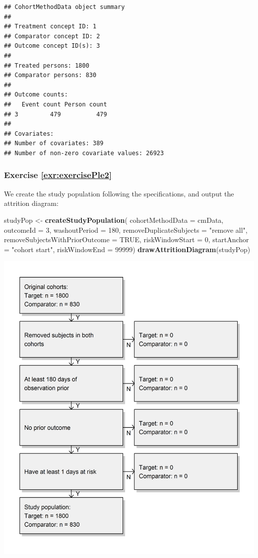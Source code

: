 \documentclass[11pt]{book}
\newenvironment{Shaded}{\begin{snugshade}}{\end{snugshade}}
\newcommand{\KeywordTok}[1]{\textcolor[rgb]{0.13,0.29,0.53}{\textbf{#1}}}
\newcommand{\DataTypeTok}[1]{\textcolor[rgb]{0.13,0.29,0.53}{#1}}
\newcommand{\DecValTok}[1]{\textcolor[rgb]{0.00,0.00,0.81}{#1}}
\newcommand{\StringTok}[1]{\textcolor[rgb]{0.31,0.60,0.02}{#1}}
\newcommand{\OtherTok}[1]{\textcolor[rgb]{0.56,0.35,0.01}{#1}}
\newcommand{\NormalTok}[1]{#1}
\theoremstyle{definition}
\theoremstyle{definition}
\theoremstyle{definition}
\theoremstyle{remark}
\begin{document}
\begin{verbatim}
## CohortMethodData object summary
## 
## Treatment concept ID: 1
## Comparator concept ID: 2
## Outcome concept ID(s): 3
## 
## Treated persons: 1800
## Comparator persons: 830
## 
## Outcome counts:
##   Event count Person count
## 3         479          479
## 
## Covariates:
## Number of covariates: 389
## Number of non-zero covariate values: 26923
\end{verbatim}

\subsubsection*{Exercise
\ref{exr:exercisePle2}}\label{exercise-refexrexerciseple2}

We create the study population following the specifications, and output
the attrition diagram:

\begin{Shaded}
\begin{Highlighting}[]
\NormalTok{studyPop <-}\StringTok{ }\KeywordTok{createStudyPopulation}\NormalTok{(}
  \DataTypeTok{cohortMethodData =}\NormalTok{ cmData,}
  \DataTypeTok{outcomeId =} \DecValTok{3}\NormalTok{,}
  \DataTypeTok{washoutPeriod =} \DecValTok{180}\NormalTok{,}
  \DataTypeTok{removeDuplicateSubjects =} \StringTok{"remove all"}\NormalTok{,}
  \DataTypeTok{removeSubjectsWithPriorOutcome =} \OtherTok{TRUE}\NormalTok{,}
  \DataTypeTok{riskWindowStart =} \DecValTok{0}\NormalTok{,}
  \DataTypeTok{startAnchor =} \StringTok{"cohort start"}\NormalTok{,}
  \DataTypeTok{riskWindowEnd =} \DecValTok{99999}\NormalTok{)}
\KeywordTok{drawAttritionDiagram}\NormalTok{(studyPop)}
\end{Highlighting}
\end{Shaded}

\begin{center}\includegraphics[width=0.8\linewidth]{images/SuggestedAnswers/attrition} \end{center}
\end{document}
